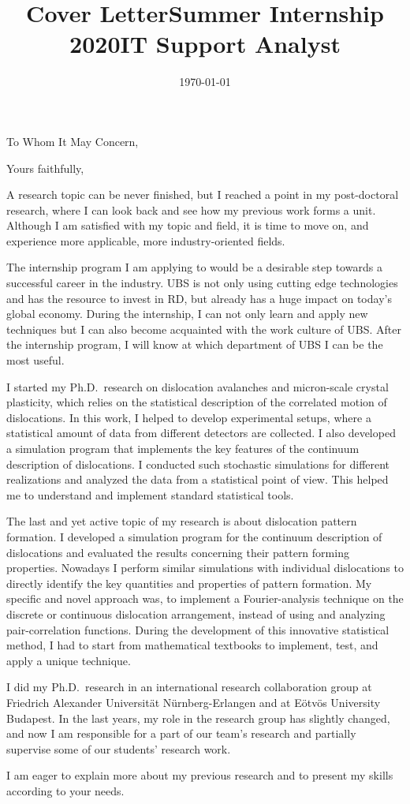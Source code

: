 \documentclass[11pt,a4paper,sans]{moderncv}        %
\title{Cover Letter\newline Summer Internship 2020\newline IT Support Analyst}                               %
\begin{document}
\date{\today}
\opening{To Whom It May Concern,}
\closing{Yours faithfully,}
\makelettertitle

A research topic can be never finished, but I reached a point in my post-doctoral research, where I can look back and see how my previous work forms a unit. Although I am satisfied with my topic and field, it is time to move on, and experience more applicable, more industry-oriented fields.

The internship program I am applying to would be a desirable step towards a successful career in the industry. UBS is not only using cutting edge technologies and has the resource to invest in RD, but already has a huge impact on today's global economy. During the internship, I can not only learn and apply new techniques but I can also become acquainted with the work culture of UBS. After the internship program, I will know at which department of UBS I can be the most useful.

I started my Ph.D.\ research on dislocation avalanches and micron-scale crystal plasticity, which relies on the statistical description of the correlated motion of dislocations. In this work, I helped to develop experimental setups, where a statistical amount of data from different detectors are collected. I also developed a simulation program that implements the key features of the continuum description of dislocations. I conducted such stochastic simulations for different realizations and analyzed the data from a statistical point of view. This helped me to understand and implement standard statistical tools.

The last and yet active topic of my research is about dislocation pattern formation. I developed a simulation program for the continuum description of dislocations and evaluated the results concerning their pattern forming properties. Nowadays I perform similar simulations with individual dislocations to directly identify the key quantities and properties of pattern formation. My specific and novel approach was, to implement a Fourier-analysis technique on the discrete or continuous dislocation arrangement, instead of using and analyzing pair-correlation functions. During the development of this innovative statistical method, I had to start from mathematical textbooks to implement, test, and apply a unique technique. 

I did my Ph.D.\ research in an international research collaboration group at Friedrich Alexander Universität Nürnberg-Erlangen and at Eötvös University Budapest. In the last years, my role in the research group has slightly changed, and now I am responsible for a part of our team’s research and partially supervise some of our students’ research work.

I am eager to explain more about my previous research and to present my skills according to your needs.

\makeletterclosing
\end{document}
